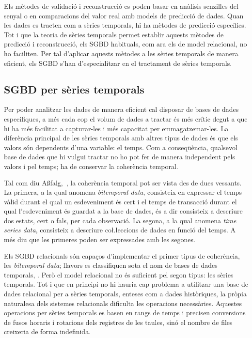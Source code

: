 Els mètodes de validació i reconstrucció es poden basar en anàlisis senzilles del senyal o en comparacions del valor real amb models de predicció de dades. Quan les dades es tracten com a sèries temporals, hi ha mètodes de predicció específics.
Tot i que la teoria de sèries temporals permet establir aquests mètodes de predicció i reconstrucció, els SGBD habituals, com ara els de model relacional, no ho faciliten.  
Per tal d'aplicar aquests mètodes a les sèries temporals de manera eficient, els SGBD s'han d'especialitzar en el tractament de sèries temporals.



\subsection{SGBD per sèries temporals}


Per poder analitzar les dades de manera eficient cal disposar de bases de dades específiques, a més cada cop el volum de dades a tractar és més crític degut a que hi ha més facilitat a capturar-les i més capacitat per emmagatzemar-les. 
La diferència principal de les sèries temporals amb altres tipus de dades és que els valors són dependents d'una variable: el temps. Com a conseqüència, qualsevol base de dades que hi vulgui tractar no ho pot fer de manera independent pels valors i pel temps; ha de conservar la coherència temporal.

Tal com diu A{\ss}falg,~\cite{assfalg08:_advan_analy_temp}, la coherència temporal pot ser vista des de dues vessants. La primera, a la qual anomena \emph{bitemporal data}, consisteix en expressar el temps vàlid durant el qual un esdeveniment és cert i el temps de transacció durant el qual l'esdeveniment és guardat a la base de dades, és a dir consisteix a descriure dos estats, cert o fals, per cada observació. La segona, a la qual anomena \emph{time series data}, consisteix a descriure co\l.leccions de dades en funció del temps. A més diu que les primeres poden ser expressades amb les segones.

Els SGBD relacionals són capaços d'implementar el primer tipus de coherència, les \emph{bitemporal data}; llavors es classifiquen sota el nom de bases de dades temporals, \cite{date,wiki:temporal_database}. Però el model relacional no és suficient pel segon tipus: les sèries temporals. Tot i que en principi no hi hauria cap problema a utilitzar una base de dades relacional per a sèries temporals, enteses com a dades històriques, la pròpia naturalesa dels sistemes relacionals  dificulta les operacions necessàries. 
Aquestes operacions per sèries temporals es basen en rangs de temps i precisen conversions de fusos horaris i rotacions dels registres de les taules, sinó el nombre de files creixeria de forma indefinida. 

